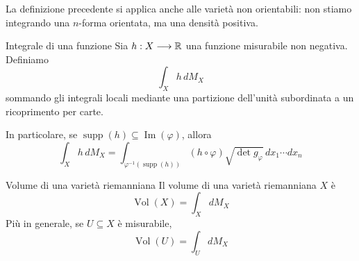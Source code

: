 \documentclass[a4paper]{article}
\begin{document}
La definizione precedente si applica anche alle varietà non orientabili: non stiamo integrando una \(n\)-forma orientata, ma una densità positiva.

\begin{snippetdefinition}{Integrale di una funzione}
Sia \(h:X\longrightarrow\mathbb{R}\) una funzione misurabile non negativa. Definiamo
\[
    \int_X h\,dM_X
\]
sommando gli integrali locali mediante una partizione dell'unità subordinata a un ricoprimento per carte.

In particolare, se \(\operatorname{supp}(h)\subseteq\operatorname{Im}(\varphi)\), allora
\[
    \int_X h\,dM_X
    =
    \int_{\varphi^{-1}(\operatorname{supp}(h))}
    (h\circ\varphi)\sqrt{\det g_\varphi}\,dx_1\cdots dx_n
\]
\end{snippetdefinition}

\begin{snippetdefinition}{Volume di una varietà riemanniana}
Il volume di una varietà riemanniana \(X\) è
\[
    \operatorname{Vol}(X)
    =
    \int_X dM_X
\]
Più in generale, se \(U\subseteq X\) è misurabile,
\[
    \operatorname{Vol}(U)
    =
    \int_U dM_X
\]
\end{snippetdefinition}
\end{document}
